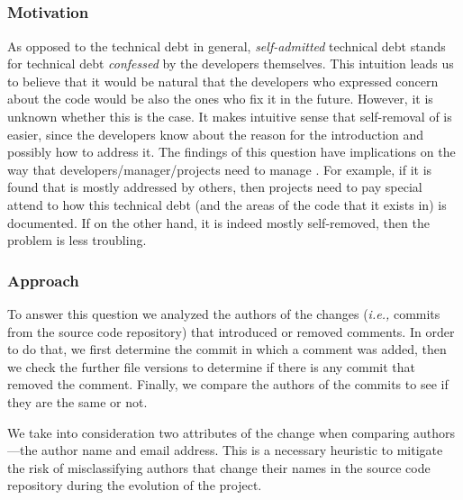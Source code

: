  

\subsection*{\rqii}

\subsubsection*{Motivation} As opposed to the technical debt in general, \emph{self-admitted} technical debt stands for technical debt \emph{confessed} by the developers themselves. This intuition leads us to believe that it would be natural that the developers who expressed concern about the code would be also the ones who fix it in the future. However, it is unknown whether this is the case. It makes intuitive sense that self-removal of \SATD is easier, since the developers know about the reason for the \SATD introduction and possibly how to address it. The findings of this question have implications on the way that developers/manager/projects need to manage \SATD. For example, if it is found that \SATD is mostly addressed by others, then projects need to pay special attend to how this technical debt (and the areas of the code that it exists in) is documented. If on the other hand, it is indeed mostly self-removed, then the problem is less troubling.



\subsubsection*{Approach} To answer this question we analyzed the authors of the changes (\textit{i.e.,} commits from the source code repository) that introduced or removed \SATD comments. In order to do that, we first determine the commit in which a \SATD comment was added, then we check the further file versions to determine if there is any commit that removed the \SATD comment. Finally, we compare the authors of the commits to see if they are the same or not. 

We take into consideration two attributes of the change when comparing authors---the author name and email address. This is a necessary heuristic to mitigate the risk of misclassifying authors that change their names in the source code repository during the evolution of the project.  




